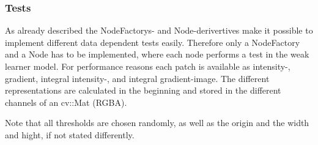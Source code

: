 \subsubsection{Tests}
As already described the NodeFactorys- and Node-derivertives make it possible to implement different data dependent tests easily. Therefore only a NodeFactory and a Node has to be implemented, where each node performs a test in the weak learner model.
For performance reasons each patch is available as intensity-, gradient, integral intensity-, and integral gradient-image. The different representations are calculated in the beginning and stored in the different channels of an cv::Mat (RGBA).

Note that all thresholds are chosen randomly, as well as the origin and the width and hight, if not stated differently.

